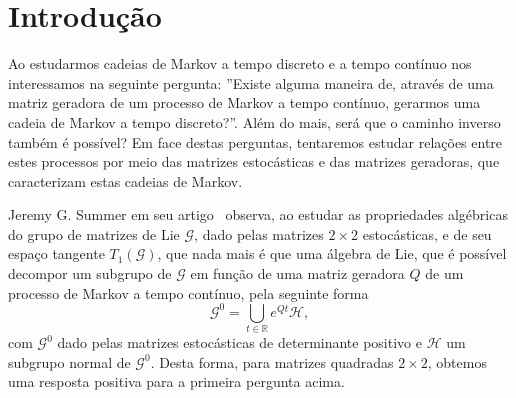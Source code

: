 \documentclass[twoside,openright,titlepage,numbers=noenddot,headinclude,  lineheaders footinclude=true,cleardoublepage=empty,
                                BCOR=5mm,paper=a4,fontsize=12pt ]{scrbook}
\theoremstyle{definition}
\begin{document}
\thispagestyle{empty}\newpage\mbox{}\thispagestyle{empty}\newpage\thispagestyle{empty} %
\frontmatter





%
%
%
%

%

%


%
\tableofcontents
%
\mainmatter




\chapter{Introdu\c{c}\~ao}
Ao estudarmos cadeias de Markov a tempo discreto e a tempo contínuo nos
interessamos na seguinte pergunta: ''Existe alguma maneira de, através de uma matriz geradora de um processo de Markov
a tempo contínuo, gerarmos uma cadeia de Markov a tempo discreto?''. Além do mais, será que o caminho 
inverso também é possível? 
Em face destas perguntas, tentaremos estudar relações
entre estes processos por meio das matrizes estocásticas e das matrizes geradoras, que caracterizam
estas cadeias de Markov.

Jeremy G. Summer em seu artigo~\cite{paper1} observa, ao estudar as propriedades algébricas do
grupo de matrizes de Lie $\mathcal{G}$,  dado pelas matrizes $2 \times 2$ estocásticas, e de seu espaço tangente $T_1(\mathcal{G})$,
que nada mais é que uma álgebra de Lie, que é possível decompor um subgrupo de $\mathcal{G}$ em função de uma 
matriz geradora $Q$ de um processo de Markov a tempo contínuo, pela seguinte forma
\[ \mathcal{G}^0 = \bigcup_{t \in \mathbb{R}}  e^{Qt} \mathcal{H}, \]
com $\mathcal{G}^0$ dado pelas matrizes estocásticas de determinante positivo e
$\mathcal{H}$ um subgrupo normal de $\mathcal{G}^0$.
Desta forma, para matrizes quadradas $2 \times 2$, obtemos uma resposta positiva para a primeira
pergunta acima. 
\end{document}
